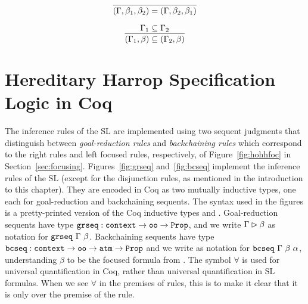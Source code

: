 \begin{lemma}[\sltm{context\_swap}] %
$$
\vcenter{\infer{(\dyncon{} , \beta_1 , \beta_2) = (\dyncon{} , \beta_2 , \beta_1)}{}}
$$
\end{lemma}

\begin{lemma}[\sltm{context\_sub\_sup}] %
\label{lem:context_sub_sup}
$$
\vcenter{\infer{(\dyncon{}_1 , \beta) \subseteq (\dyncon{}_2 , \beta)}{\dyncon{}_1 \subseteq \dyncon{}_2}}
$$
\end{lemma}

\section{Hereditary Harrop Specification Logic in Coq}
\label{sec:hhsl}

The inference rules of the SL are implemented using two sequent judgments that distinguish between \emph{goal-reduction rules} and \emph{backchaining rules} which correspond to the right rules and left focused rules, respectively, of Figure~\ref{fig:hohhfoc} in Section~\ref{sec:focusing}. %
Figures~\ref{fig:grseq} and~\ref{fig:bcseq} implement the inference rules of the SL (except for the disjunction rules, as mentioned in the introduction to this chapter). They are encoded in Coq as two mutually inductive types, one each for goal-reduction and backchaining sequents. The syntax used in the figures is a pretty-printed version of the Coq inductive types  and . Goal-reduction sequents have type $\texttt{grseq} : \texttt{context} \rightarrow \texttt{oo} \rightarrow \texttt{Prop}$, and we write $\Gamma{} \rhd \beta$ as notation for $\texttt{grseq}~\Gamma{}~ \beta$. Backchaining sequents have type $\texttt{bcseq} : \texttt{context} \rightarrow \texttt{oo} \rightarrow \texttt{atm} \rightarrow \texttt{Prop}$ and we write \bchsl{\beta}{\alpha} as notation for $\texttt{bcseq}~ \Gamma{}~ \beta~ \alpha$, understanding $\beta$ to be the focused formula from \dyncon{}. The symbol $\forall$ is used for universal quantification in Coq, rather than universal quantification in SL formulas. When we see $\forall$ in the premises of rules, this is to make it clear that it is only over the premise of the rule. 

